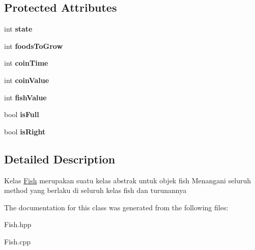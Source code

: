\subsection*{Protected Attributes}
\begin{DoxyCompactItemize}
\item 
\mbox{\label{classFish_ab77f075818cbdd5e350379418a35172d}} 
int {\bfseries state}
\item 
\mbox{\label{classFish_a2a3e810d6b92aea2c29c69635c32a6ce}} 
int {\bfseries foods\+To\+Grow}
\item 
\mbox{\label{classFish_ae9fdbf6d08fefff329bac0ee2e58ea2d}} 
int {\bfseries coin\+Time}
\item 
\mbox{\label{classFish_a749b3925d3efc3a0b6278efccfe3dbea}} 
int {\bfseries coin\+Value}
\item 
\mbox{\label{classFish_acdd9042f3010004eb28bbd33fd215835}} 
int {\bfseries fish\+Value}
\item 
\mbox{\label{classFish_af2e4a0561696f400efbb196c937f04cb}} 
bool {\bfseries is\+Full}
\item 
\mbox{\label{classFish_a24723b3118965b94d4be7a48e31d482b}} 
bool {\bfseries is\+Right}
\end{DoxyCompactItemize}


\subsection{Detailed Description}
Kelas \hyperlink{classFish}{Fish} merupakan suatu kelas abstrak untuk objek fish Menangani seluruh method yang berlaku di seluruh kelas fish dan turunannya 

The documentation for this class was generated from the following files\+:\begin{DoxyCompactItemize}
\item 
Fish.\+hpp\item 
Fish.\+cpp\end{DoxyCompactItemize}
